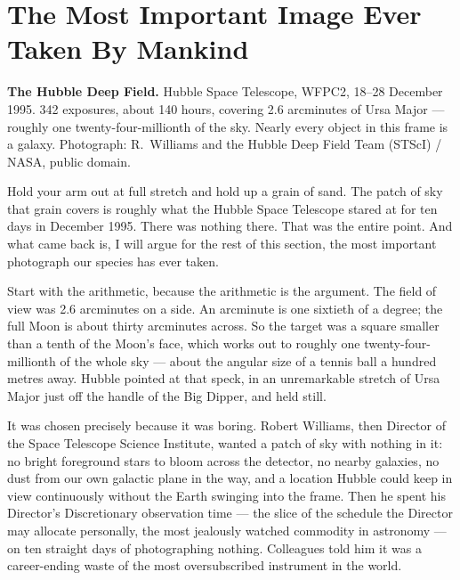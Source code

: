 \section{The Most Important Image Ever Taken By Mankind}\label{sec:mostimportantimageeverta}

\begin{center}
\par\vspace{4pt}
{\RaggedRight\scriptsize\color{steel}\textbf{\textcolor{ufogreenink}{The Hubble Deep Field.}}
Hubble Space Telescope, WFPC2, 18--28 December 1995. 342 exposures, about 140 hours,
covering 2.6 arcminutes of Ursa Major --- roughly one twenty-four-millionth of the sky.
Nearly every object in this frame is a galaxy. Photograph: R.~Williams and the Hubble
Deep Field Team (STScI) / NASA, public domain.\par
{} \par}
\end{center}
\vspace{6pt}

Hold your arm out at full stretch and hold up a grain of sand. The patch of sky that
grain covers is roughly what the Hubble Space Telescope stared at for ten days in
December 1995. There was nothing there. That was the entire point. And what came back is,
I will argue for the rest of this section, the most important photograph our species has
ever taken.

Start with the arithmetic, because the arithmetic is the argument. The field of view was
2.6 arcminutes on a side. An arcminute is one sixtieth of a degree; the full Moon is
about thirty arcminutes across. So the target was a square smaller than a tenth of the
Moon's face, which works out to roughly one twenty-four-millionth of the whole sky ---
about the angular size of a tennis ball a hundred metres away. Hubble pointed at that
speck, in an unremarkable stretch of Ursa Major just off the handle of the Big Dipper,
and held still.

It was chosen precisely because it was boring. Robert Williams, then Director of the
Space Telescope Science Institute, wanted a patch of sky with nothing in it: no bright
foreground stars to bloom across the detector, no nearby galaxies, no dust from our own
galactic plane in the way, and a location Hubble could keep in view continuously without
the Earth swinging into the frame. Then he spent his Director's Discretionary
observation time --- the slice of the schedule the Director may allocate personally, the
most jealously watched commodity in astronomy --- on ten straight days of photographing
nothing. Colleagues told him it was a career-ending waste of the most oversubscribed
instrument in the world.

